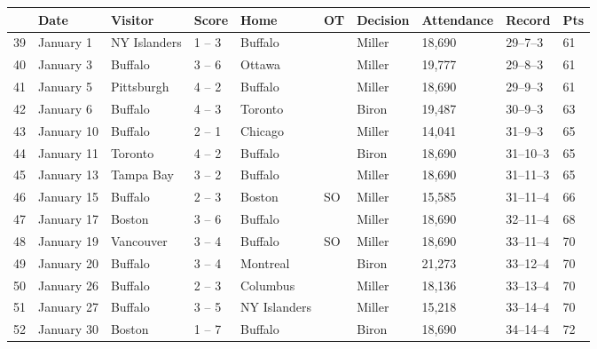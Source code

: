 \documentclass{article}
\begin{document}
\begin{tabular}{llllllllll}
\toprule
 & Date & Visitor & Score & Home & OT & Decision & Attendance & Record & Pts \\
\midrule
39 & January 1 & NY Islanders & 1 – 3 & Buffalo &  & Miller & 18,690 & 29–7–3 & 61 \\
40 & January 3 & Buffalo & 3 – 6 & Ottawa &  & Miller & 19,777 & 29–8–3 & 61 \\
41 & January 5 & Pittsburgh & 4 – 2 & Buffalo &  & Miller & 18,690 & 29–9–3 & 61 \\
42 & January 6 & Buffalo & 4 – 3 & Toronto &  & Biron & 19,487 & 30–9–3 & 63 \\
43 & January 10 & Buffalo & 2 – 1 & Chicago &  & Miller & 14,041 & 31–9–3 & 65 \\
44 & January 11 & Toronto & 4 – 2 & Buffalo &  & Biron & 18,690 & 31–10–3 & 65 \\
45 & January 13 & Tampa Bay & 3 – 2 & Buffalo &  & Miller & 18,690 & 31–11–3 & 65 \\
46 & January 15 & Buffalo & 2 – 3 & Boston & SO & Miller & 15,585 & 31–11–4 & 66 \\
47 & January 17 & Boston & 3 – 6 & Buffalo &  & Miller & 18,690 & 32–11–4 & 68 \\
48 & January 19 & Vancouver & 3 – 4 & Buffalo & SO & Miller & 18,690 & 33–11–4 & 70 \\
49 & January 20 & Buffalo & 3 – 4 & Montreal &  & Biron & 21,273 & 33–12–4 & 70 \\
50 & January 26 & Buffalo & 2 – 3 & Columbus &  & Miller & 18,136 & 33–13–4 & 70 \\
51 & January 27 & Buffalo & 3 – 5 & NY Islanders &  & Miller & 15,218 & 33–14–4 & 70 \\
52 & January 30 & Boston & 1 – 7 & Buffalo &  & Biron & 18,690 & 34–14–4 & 72 \\
\bottomrule
\end{tabular}
\end{document}
